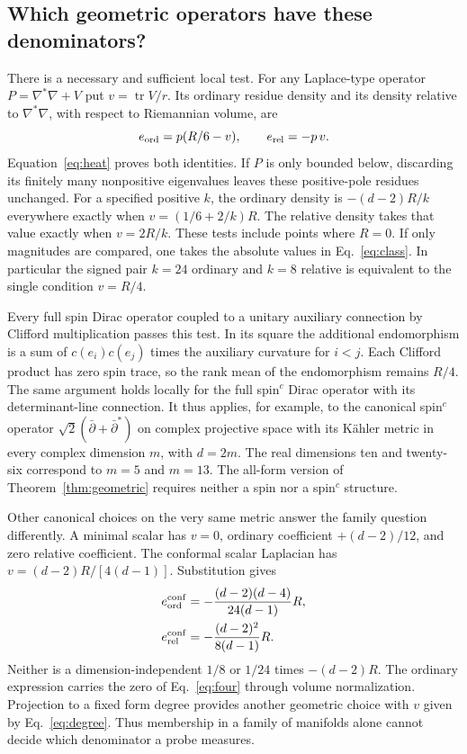 \documentclass[aps,prd,reprint,onecolumn,nofootinbib,amsmath,amssymb]{revtex4-2}
\begin{document}
\subsection{Which geometric operators have these denominators?}

There is a necessary and sufficient local test. For any Laplace-type
operator \(P=\nabla^*\nabla+V\) put \(v=\operatorname{tr}V/r\).
Its ordinary residue density and its density relative to
\(\nabla^*\nabla\), with respect to Riemannian volume, are
\begin{equation}
 e_{\rm ord}=p(R/6-v),\qquad e_{\rm rel}=-p\,v .
 \label{eq:class}
\end{equation}
Equation~\eqref{eq:heat} proves both identities. If \(P\) is only bounded
below, discarding its finitely many nonpositive eigenvalues leaves these
positive-pole residues unchanged. For a specified positive \(k\), the
ordinary density is \(-(d-2)R/k\) everywhere exactly when
\(v=(1/6+2/k)R\). The relative density takes that value exactly when
\(v=2R/k\). These tests include points where \(R=0\). If only magnitudes
are compared, one takes the absolute values in Eq.~\eqref{eq:class}.
In particular the signed pair \(k=24\) ordinary and \(k=8\) relative
is equivalent to the single condition \(v=R/4\).

Every full spin Dirac operator coupled to a unitary auxiliary connection
by Clifford multiplication passes this test. In its square the additional
endomorphism is a sum of \(c(e_i)c(e_j)\) times the auxiliary curvature
for \(i<j\). Each Clifford product has zero spin trace, so the rank mean
of the endomorphism remains \(R/4\). The same argument holds locally
for the full spin\(^{c}\) Dirac operator with its determinant-line
connection. It thus applies, for example, to the canonical spin\(^{c}\)
operator \(\sqrt{2}(\bar\partial+\bar\partial^*)\) on complex projective
space with its Kähler metric in every complex dimension \(m\), with
\(d=2m\). The real dimensions ten and twenty-six correspond to \(m=5\)
and \(m=13\). The all-form version of Theorem~\ref{thm:geometric}
requires neither a spin nor a spin\(^{c}\) structure.

Other canonical choices on the very same metric answer the family
question differently. A minimal scalar has \(v=0\), ordinary coefficient
\(+(d-2)/12\), and zero relative coefficient. The conformal scalar
Laplacian has \(v=(d-2)R/[4(d-1)]\). Substitution gives
\begin{equation}
 \begin{aligned}
 e_{\rm ord}^{\rm conf}
  &= -\frac{(d-2)(d-4)}{24(d-1)}R ,\\
 e_{\rm rel}^{\rm conf}
  &= -\frac{(d-2)^2}{8(d-1)}R .
 \end{aligned}
 \label{eq:conformal}
\end{equation}
Neither is a dimension-independent \(1/8\) or \(1/24\) times
\(-(d-2)R\). The ordinary expression carries the zero of Eq.~\eqref{eq:four}
through volume normalization.
Projection to a fixed form degree provides another geometric choice with
\(v\) given by Eq.~\eqref{eq:degree}. Thus membership in a family of
manifolds alone cannot decide which denominator a probe measures.
\end{document}
